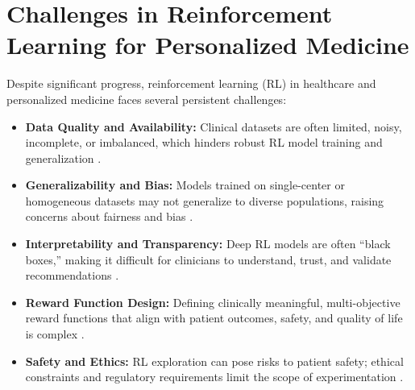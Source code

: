 
\section{Challenges in Reinforcement Learning for Personalized Medicine}

Despite significant progress, reinforcement learning (RL) in healthcare and personalized medicine faces several persistent challenges:

\begin{itemize}
    \item \textbf{Data Quality and Availability:} Clinical datasets are often limited, noisy, incomplete, or imbalanced, which hinders robust RL model training and generalization \cite{yangDeepReinforcementLearning2024, killianEmpiricalStudyRepresentation2020, deshmukhReinforcementLearningHealthcare2024, luoReinforcementLearningDynamic2024, barataReinforcementLearningModel2023, hassouniClusteringbasedReinforcementLearning2020, mulaniDeepReinforcementLearning2020}.
    \item \textbf{Generalizability and Bias:} Models trained on single-center or homogeneous datasets may not generalize to diverse populations, raising concerns about fairness and bias \cite{ohEffectiveDatadrivenPrecision2022, banumathiReinforcementLearningPersonalized2025, banumathiReinforcementLearningPersonalized2025a, zadehOptimizingWarfarinDosing2023, zhengPersonalizedMultimorbidityManagement2021}.
    \item \textbf{Interpretability and Transparency:} Deep RL models are often ``black boxes,'' making it difficult for clinicians to understand, trust, and validate recommendations \cite{maDeepAttentionQnetwork2023, deshmukhReinforcementLearningHealthcare2024, barataReinforcementLearningModel2023, wuValuebasedDeepReinforcement2023, frommeyerReinforcementLearningIts2025, banumathiReinforcementLearningPersonalized2025}.
    \item \textbf{Reward Function Design:} Defining clinically meaningful, multi-objective reward functions that align with patient outcomes, safety, and quality of life is complex \cite{luoReinforcementLearningDynamic2024, frommeyerReinforcementLearningIts2025, petersenDeepReinforcementLearning2019, yangPrescDRLDeepReinforcement2024, zadehOptimizingWarfarinDosing2023}.
    \item \textbf{Safety and Ethics:} RL exploration can pose risks to patient safety; ethical constraints and regulatory requirements limit the scope of experimentation \cite{zhaoSafeenhancedFullyClosedloop2025, deshmukhReinforcementLearningHealthcare2024, mulaniDeepReinforcementLearning2020, gorrepatiReinforcementLearningFramework2025, yuSupervisedactorcriticReinforcementLearning2020}.

\end{itemize}
